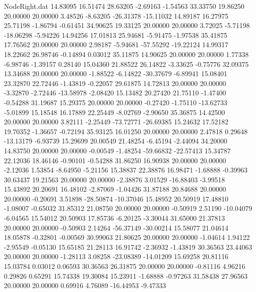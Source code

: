 \begin{filecontents}{NodeRight.dat}
  14.83095   16.51474   28.63205    -2.69163   -1.54563   33.33750   19.86250   20.00000   20.00000    3.48526   -8.63205  -26.31378  -15.11032
  14.89187   16.27975   25.71198    -1.86794   -0.61451   34.90625   19.33125   20.00000   20.00000    3.72025   -5.71198  -18.06298   -5.94226
  14.94256   17.01813   25.94681    -5.91475   -1.97538   35.41875   17.76562   20.00000   20.00000    2.98187   -5.94681  -57.55292  -19.22124
  14.99317   18.22662   26.98746    -0.14894    0.03012   35.11875   14.90625   20.00000   20.00000    1.77338   -6.98746   -1.39157    0.28140
  15.04360   21.88522   26.14822    -3.33625   -0.75776   32.09375   13.34688   20.00000   20.00000   -1.88522   -6.14822  -30.37679   -6.89941
  15.08401   23.32870   22.72446    -1.43819   -0.22057   29.61875   14.72813   20.00000   20.00000   -3.32870   -2.72446  -13.58978   -2.08420
  15.13482   20.27420   21.75110    -1.47400   -0.54288   31.19687   15.29375   20.00000   20.00000   -0.27420   -1.75110  -13.62733   -5.01899
  15.18548   16.17889   22.25449    -8.02769   -2.90650   35.36875   14.42500   20.00000   20.00000    3.82111   -2.25449  -73.72771  -26.69385
  15.24632   17.52182   19.70352    -1.36657   -0.72194   35.93125   16.01250   20.00000   20.00000    2.47818    0.29648  -13.13179   -6.93739
  15.29699   20.00549   21.48254    -6.45194   -2.44094   34.20000   14.83750   20.00000   20.00000   -0.00549   -1.48254  -59.66832  -22.57413
  15.34787   22.12036   18.46146    -0.90101   -0.54288   31.86250   16.90938   20.00000   20.00000   -2.12036    1.53854   -8.64950   -5.21156
  15.38837   22.38876   16.98471    -1.68888   -0.39963   30.63437   19.21563   20.00000   20.00000   -2.38876    3.01529  -16.88403   -3.99518
  15.43892   20.20691   16.48102    -2.87069   -1.04426   31.87188   20.84688   20.00000   20.00000   -0.20691    3.51898  -28.50874  -10.37046
  15.48952   20.50919   17.48810    -1.08007   -0.65032   31.85312   21.08750   20.00000   20.00000   -0.50919    2.51190  -10.04079   -6.04565
  15.54012   20.50903   17.85736    -6.20125   -3.30044   31.65000   21.37813   20.00000   20.00000   -0.50903    2.14264  -56.37149  -30.00214
  15.58077   21.04614   18.05878    -0.32801   -0.00569   30.99063   21.80625   20.00000   20.00000   -1.04614    1.94122   -2.95549   -0.05130
  15.65185   21.28113   16.91742    -2.36932   -1.43819   30.36563   23.44063   20.00000   20.00000   -1.28113    3.08258  -23.08389  -14.01209
  15.69258   20.81116   15.03784     0.03012    0.06593   30.36563   26.31875   20.00000   20.00000   -0.81116    4.96216    0.29826    0.65291
  15.74338   19.30084   15.23911    -1.68888   -0.97263   31.58438   27.96563   20.00000   20.00000    0.69916    4.76089  -16.44953   -9.47333

\end{filecontents}
